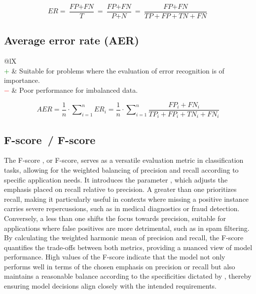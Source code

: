\documentclass{article}
\begin{document}
\begin{equation}
	\textit{ER} = \dfrac{\textit{FP} + \textit{FN}}{\textit{T}} = \dfrac{\textit{FP} + \textit{FN}}{\textit{P} + \textit{N}} = \dfrac{\textit{FP} + \textit{FN}}{\textit{TP} + \textit{FP} + \textit{TN} + \textit{FN}}
%
	\label{equation:ER}
\end{equation}


\subsection[Average error rate (AER)]{Average error rate (AER) \cite{hamamoto1998gabor, han2016variable}}

\begin{table}[H]\centering
	\begin{tabularx}{\textwidth}{@{}lX}
		 \\
		\textcolor{Green}{$+$} & Suitable for problems where the evaluation of error recognition is of importance. \\
		\textcolor{Red}{$-$}   & Poor performance for imbalanced data.
	\end{tabularx}
\end{table}

\begin{equation}
	\textit{AER} = \dfrac{1}{n} \cdot \sum\nolimits_{i = 1}^n \textit{ER}_i = \dfrac{1}{n} \cdot \sum\nolimits_{i = 1}^n \dfrac{\textit{FP}_i + \textit{FN}_i}{\textit{TP}_i + \textit{FP}_i + \textit{TN}_i + \textit{FN}_i}
%
	\label{equation:AER}
\end{equation}


\subsection[F-score~/ F\textbeta-score]{F-score~/ F\textbeta-score \cite{van2004geometry, taha2015metrics}}

The F-score \cite{van2004geometry, taha2015metrics}, or F\textbeta-score, serves as a versatile evaluation metric in classification tasks, allowing for the weighted balancing of precision and recall according to specific application needs. It introduces the parameter \textbeta, which adjusts the emphasis placed on recall relative to precision. A \textbeta{} greater than one prioritizes recall, making it particularly useful in contexts where missing a positive instance carries severe repercussions, such as in medical diagnostics or fraud detection. Conversely, a \textbeta{} less than one shifts the focus towards precision, suitable for applications where false positives are more detrimental, such as in spam filtering. By calculating the weighted harmonic mean of precision and recall, the F\textbeta-score quantifies the trade-offs between both metrics, providing a nuanced view of model performance. High values of the F\textbeta-score indicate that the model not only performs well in terms of the chosen emphasis on precision or recall but also maintains a reasonable balance according to the specificities dictated by \textbeta, thereby ensuring model decisions align closely with the intended requirements.
\end{document}
